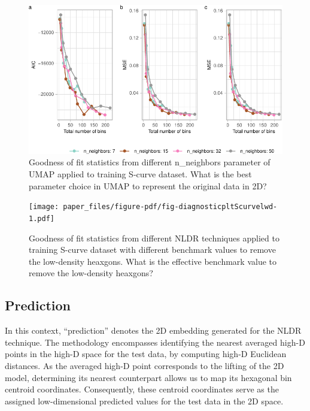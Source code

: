 \documentclass[
  12pt]{article}
\begin{document}
\begin{figure}

{\centering \includegraphics[width=1\textwidth,height=\textheight]{paper_files/figure-pdf/fig-diagnosticpltDiffParam-1.pdf}

}

\caption{\label{fig-diagnosticpltDiffParam}Goodness of fit statistics
from different n\_neighbors parameter of UMAP applied to training
S-curve dataset. What is the best parameter choice in UMAP to represent
the original data in 2D?}

\end{figure}

\begin{figure}

{\centering \texttt{[image: paper\_files/figure-pdf/fig-diagnosticpltScurvelwd-1.pdf]}

}

\caption{\label{fig-diagnosticpltScurvelwd}Goodness of fit statistics
from different NLDR techniques applied to training S-curve dataset with
different benchmark values to remove the low-density heaxgons. What is
the effective benchmark value to remove the low-density heaxgons?}

\end{figure}

\hypertarget{sec-prediction}{%
\subsection{Prediction}\label{sec-prediction}}

In this context, ``prediction'' denotes the 2D embedding generated for
the NLDR technique. The methodology encompasses identifying the nearest
averaged high-D points in the high-D space for the test data, by
computing high-D Euclidean distances. As the averaged high-D point
corresponds to the lifting of the 2D model, determining its nearest
counterpart allows us to map its hexagonal bin centroid coordinates.
Consequently, these centroid coordinates serve as the assigned
low-dimensional predicted values for the test data in the 2D space.
\end{document}
